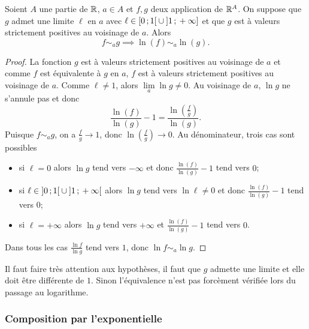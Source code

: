 \begin{prop}
  Soient \(A\) une partie de \(\mathbb{R}\), \(a \in A\) et \(f, g\) deux application de
  \(\mathbb{R}^A\). On suppose que \(g\) admet une limite \(\ell\) en \(a\) avec \(\ell
  \in \left[ 0 \, ; {} 1 \right[ \cup \left] 1 \, ; {} +\infty \right]\) et que \(g\) est à
  valeurs strictement positives au voisinage de \(a\). Alors
  \begin{equation}
    f \sim_a g \implies \ln(f) \sim_a \ln(g).
  \end{equation}
\end{prop}
\begin{proof}
  La fonction \(g\) est à valeurs strictement positives au voisinage de \(a\) et
  comme \(f\) est équivalente à \(g\) en \(a\), \(f\) est à valeurs strictement
  positives au voisinage de \(a\). Comme \(\ell \neq 1\), alors
  \(\lim\limits_{a} \ln g \neq 0\). Au voisinage de \(a\), \(\ln g\) ne s'annule
  pas et donc
  \begin{equation}
    \frac{\ln(f)}{\ln(g)}-1=\frac{\ln\left(\frac{f}{g}\right)}{\ln(g)}.
  \end{equation}
  Puisque \(f \sim_a g\), on a \(\frac{f}{g} \to 1\), donc
  \(\ln\left(\frac{f}{g}\right) \to 0\). Au dénominateur, trois cas sont
  possibles
  \begin{itemize}
    \item si \(\ell =0\) alors \(\ln g\) tend vers \(-\infty\) et donc
      \(\frac{\ln(f)}{\ln(g)}-1\) tend vers \(0\);
    \item si \(\ell \in \left] 0 \, ; {} 1 \right[ \cup \left] 1 \, ; {} +\infty \right[\)
      alors \(\ln g\) tend vers \(\ln \ell \neq 0\) et donc
      \(\frac{\ln(f)}{\ln(g)}-1\) tend vers \(0\);
    \item si \(\ell = +\infty\) alors \(\ln g\) tend vers \(+\infty\) et
      \(\frac{\ln(f)}{\ln(g)}-1\) tend vers \(0\).
  \end{itemize}
  Dans tous les cas \(\frac{\ln f}{\ln g}\) tend vers \(1\), donc \(\ln f \sim_a
  \ln g\).
\end{proof}

Il faut faire très attention aux hypothèses, il faut que \(g\) admette une
limite et elle doit être différente de \(1\). Sinon l'équivalence n'est pas
forcèment vérifiée lors du passage au logarithme.

\subsubsection{Composition par l'exponentielle}


